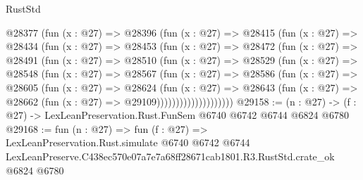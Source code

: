 \begin{lexlean}{RustStd}
\begin{coremodule}
          @28377
            (fun (x : @27) =>
            @28396
              (fun (x : @27) =>
              @28415
                (fun (x : @27) =>
                @28434
                  (fun (x : @27) =>
                  @28453
                    (fun (x : @27) =>
                    @28472
                      (fun (x : @27) =>
                      @28491
                        (fun (x : @27) =>
                        @28510
                          (fun (x : @27) =>
                          @28529
                            (fun (x : @27) =>
                            @28548
                              (fun (x : @27) =>
                              @28567
                                (fun (x : @27) =>
                                @28586
                                  (fun (x : @27) =>
                                  @28605
                                    (fun (x : @27) =>
                                    @28624
                                      (fun (x : @27) =>
                                      @28643
                                        (fun (x : @27) =>
                                        @28662 (fun (x : @27) => @29109))))))))))))))))))))
@29158 := (n : @27) -> (f : @27) -> LexLeanPreservation.Rust.FunSem @6740 @6742 @6744 @6824 @6780
@29168 := fun (n : @27) =>
  fun (f : @27) =>
  LexLeanPreservation.Rust.simulate
    @6740
    @6742
    @6744
    LexLeanPreserve.C438ec570e07a7e7a68ff28671cab1801.R3.RustStd.crate_ok
    @6824
    @6780
\end{coremodule}
\end{lexlean}
